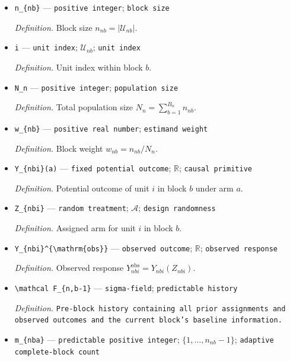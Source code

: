 \documentclass{article}
\begin{document}
\begin{itemize}
  \item \texttt{n\_\allowbreak{}\{nb\}\allowbreak{}} --- \texttt{positive integer}; \texttt{block size}
  \par\smallskip\noindent\emph{Definition.} Block size \(n_{nb}=|\mathcal U_{nb}|\).
  \item \texttt{i} --- \texttt{unit index}; \(\mathcal U_{nb}\); \texttt{unit index}
  \par\smallskip\noindent\emph{Definition.} Unit index within block \(b\).
  \item \texttt{N\_\allowbreak{}n} --- \texttt{positive integer}; \texttt{population size}
  \par\smallskip\noindent\emph{Definition.} Total population size \(N_n=\sum_{b=1}^{B_n}n_{nb}\).
  \item \texttt{w\_\allowbreak{}\{nb\}\allowbreak{}} --- \texttt{positive real number}; \texttt{estimand weight}
  \par\smallskip\noindent\emph{Definition.} Block weight \(w_{nb}=n_{nb}/N_n\).
  \item \texttt{Y\_\allowbreak{}\{nbi\}\allowbreak{}(a)} --- \texttt{fixed potential outcome}; \(\mathbb R\); \texttt{causal primitive}
  \par\smallskip\noindent\emph{Definition.} Potential outcome of unit \(i\) in block \(b\) under arm \(a\).
  \item \texttt{Z\_\allowbreak{}\{nbi\}\allowbreak{}} --- \texttt{random treatment}; \(\mathcal A\); \texttt{design randomness}
  \par\smallskip\noindent\emph{Definition.} Assigned arm for unit \(i\) in block \(b\).
  \item \texttt{Y\_\allowbreak{}\{nbi\}\allowbreak{}\textasciicircum{}\{\textbackslash{}\allowbreak{}mathrm\{obs\}\allowbreak{}\}\allowbreak{}} --- \texttt{observed outcome}; \(\mathbb R\); \texttt{observed response}
  \par\smallskip\noindent\emph{Definition.} Observed response \(Y_{nbi}^{\mathrm{obs}}=Y_{nbi}(Z_{nbi})\).
  \item \texttt{\textbackslash{}\allowbreak{}mathcal F\_\allowbreak{}\{n,\allowbreak{}b-\allowbreak{}1\}\allowbreak{}} --- \texttt{sigma-\allowbreak{}field}; \texttt{predictable history}
  \par\smallskip\noindent\emph{Definition.} \texttt{Pre-\allowbreak{}block history containing all prior assignments and observed outcomes and the current block's baseline information.}
  \item \texttt{m\_\allowbreak{}\{nba\}\allowbreak{}} --- \texttt{predictable positive integer}; \(\{1,\ldots,n_{nb}-1\}\); \texttt{adaptive complete-\allowbreak{}block count}

\end{itemize}
\end{document}
